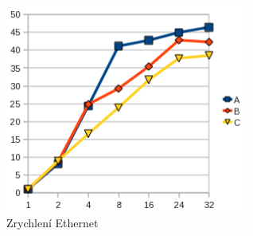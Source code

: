 \documentclass[12pt]{article}
\begin{document}
\begin{figure}[h]
\begin{center}
\includegraphics[width=8cm]{grafy-zprava/zrychlenieth.png}
\caption{Zrychlení Ethernet}
\label{fig:zrychlenieth}
\end{center}
\end{figure}
\end{document}
